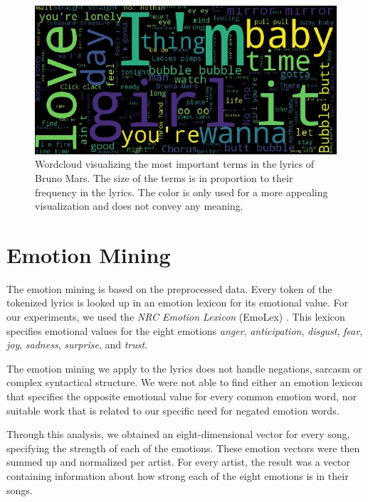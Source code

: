 \documentclass[10pt,a4paper]{article}
\begin{document}
	\begin{figure}[htb]
		\centering
		\includegraphics[width=\linewidth]{data/wordcloud}
		\caption{Wordcloud visualizing the most important terms in the lyrics of Bruno Mars. The size of the terms is in proportion to their frequency in the lyrics. The color is only used for a more appealing visualization and does not convey any meaning.}
		\label{fig:wordcloud}
	\end{figure}
	
	\section{Emotion Mining}
	\label{sec:emotionmining}
	
	The emotion mining is based on the preprocessed data. Every token of the tokenized lyrics is looked up in an emotion lexicon for its emotional value. For our experiments, we used the \textit{NRC Emotion Lexicon} (EmoLex) \cite{emolex}. This lexicon specifies emotional values for the eight emotions \textit{anger}, \textit{anticipation}, \textit{disgust}, \textit{fear}, \textit{joy}, \textit{sadness}, \textit{surprise}, and \textit{trust}.
	
	The emotion mining we apply to the lyrics does not handle negations, sarcasm or complex syntactical structure. We were not able to find either an emotion lexicon that specifies the opposite emotional value for every common emotion word, nor suitable work that is related to our specific need for negated emotion words.
	
	Through this analysis, we obtained an eight-dimensional vector for every song, specifying the strength of each of the emotions. These emotion vectors were then summed up and normalized per artist. For every artist, the result was a vector containing information about how strong each of the eight emotions is in their songs.
	
\end{document}
